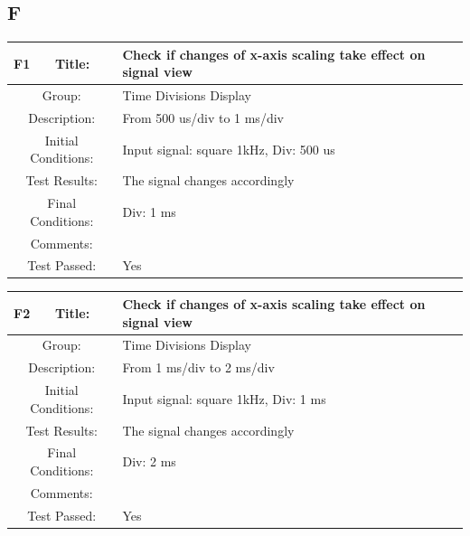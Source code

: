 \documentclass[12pt]{article}
\begin{document}
\subsection{F}
		\begin{table}[H]%
	\begin{center}
		\begin{tabular}{| m{2cm}|m{2cm}|m{12cm}|}
			\hline 
			\bf F1&\bf Title:&\bf Check if changes of x-axis scaling take effect on signal view\\ 
			\hline 
			\multicolumn{2}{|c|}{Group:}&Time Divisions Display\\ 
			\hline 
			\multicolumn{2}{|c|}{Description:}&From 500 us/div to 1 ms/div\\ 
			\hline 
			\multicolumn{2}{|c|}{Initial Conditions:}&Input signal: square 1kHz, Div: 500 us\\ 
			\hline 
			\multicolumn{2}{|c|}{Test Results:}&The signal changes accordingly\\ 
			\hline 
			\multicolumn{2}{|c|}{Final Conditions:}&Div: 1 ms\\ 
			\hline 
			\multicolumn{2}{|c|}{Comments:}&\\ 
			\hline 
			\multicolumn{2}{|c|}{Test Passed:}&Yes \\ 
			\hline 
		\end{tabular} 
	\end{center}
\end{table}	
		\begin{table}[H]
	\begin{center}
		\begin{tabular}{| m{2cm}|m{2cm}|m{12cm}|}
			\hline 
			\bf F2&\bf Title:&\bf Check if changes of x-axis scaling take effect on signal view\\ 
			\hline 
			\multicolumn{2}{|c|}{Group:}&Time Divisions Display\\ 
			\hline 
			\multicolumn{2}{|c|}{Description:}&From 1 ms/div to 2 ms/div\\ 
			\hline 
			\multicolumn{2}{|c|}{Initial Conditions:}&Input signal: square 1kHz, Div: 1 ms\\ 
			\hline 
			\multicolumn{2}{|c|}{Test Results:}&The signal changes accordingly\\ 
			\hline 
			\multicolumn{2}{|c|}{Final Conditions:}&Div: 2 ms \\ 
			\hline 
			\multicolumn{2}{|c|}{Comments:}&\\ 
			\hline 
			\multicolumn{2}{|c|}{Test Passed:}&Yes \\ 
			\hline 
		\end{tabular} 
	\end{center}
\end{table}	
\end{document}
